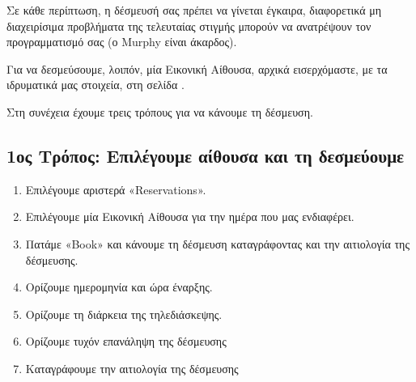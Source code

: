 \documentclass[letterpaper,10pt,greek]{sphinxhowto}
\begin{document}
\sphinxAtStartPar
Σε κάθε περίπτωση, η δέσμευσή σας πρέπει να γίνεται έγκαιρα, διαφορετικά  μη διαχειρίσιμα
προβλήματα της τελευταίας στιγμής μπορούν να ανατρέψουν τον προγραμματισμό σας (ο Murphy είναι άκαρδος).

\sphinxAtStartPar
Για να δεσμεύσουμε, λοιπόν, μία Εικονική Αίθουσα, αρχικά εισερχόμαστε, με τα ιδρυματικά μας στοιχεία,
στη σελίδα .

\sphinxAtStartPar
Στη συνέχεια έχουμε τρεις τρόπους για να κάνουμε τη δέσμευση.


\subsection{1ος Τρόπος: Επιλέγουμε αίθουσα και τη δεσμεύουμε}
\label{\detokenize{HowToZoom:id1}}\begin{enumerate}
%
\item {} 
\sphinxAtStartPar
Επιλέγουμε αριστερά «Reservations».

\item {} 
\sphinxAtStartPar
Επιλέγουμε μία Εικονική Αίθουσα για την ημέρα που μας ενδιαφέρει.

\item {} 
\sphinxAtStartPar
Πατάμε «Book» και κάνουμε τη δέσμευση καταγράφοντας και την αιτιολογία της δέσμευσης.

\item {} 
\sphinxAtStartPar
Ορίζουμε ημερομηνία και ώρα έναρξης.

\item {} 
\sphinxAtStartPar
Ορίζουμε τη διάρκεια της τηλεδιάσκεψης.

\item {} 
\sphinxAtStartPar
Ορίζουμε τυχόν επανάληψη της δέσμευσης

\item {} 
\sphinxAtStartPar
Καταγράφουμε την αιτιολογία της δέσμευσης

\end{enumerate}
\end{document}
